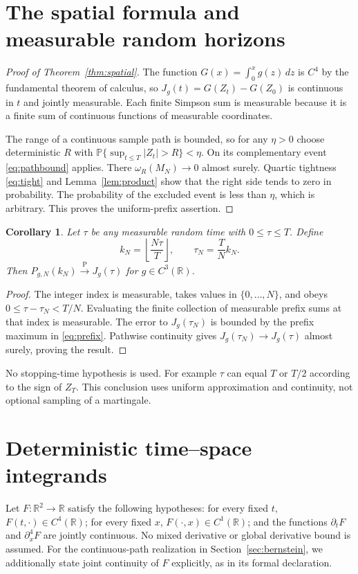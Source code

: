 \documentclass[11pt]{article}
\newtheorem{corollary}[theorem]{Corollary}
\theoremstyle{remark}\newtheorem{remark}[theorem]{Remark}
\newcommand{\R}{\mathbb R}\newcommand{\Pconv}{\xrightarrow{\mathrm P}}
\begin{document}
\section{The spatial formula and measurable random horizons}
\begin{proof}[Proof of Theorem~\ref{thm:spatial}]
The function $G(x)=\int_0^xg(z)\,dz$ is $C^4$ by the fundamental
theorem of calculus, so $J_g(t)=G(Z_t)-G(Z_0)$ is continuous in
$t$ and jointly measurable. Each finite Simpson sum is measurable
because it is a finite sum of continuous functions of measurable
coordinates.

The range of a continuous sample path is bounded, so for any
$\eta>0$ choose deterministic $R$ with
$\mathbb P\{\sup_{t\leq T}|Z_t|>R\}<\eta$.
On its complementary event \eqref{eq:pathbound} applies.
There $\omega_R(M_N)\to0$ almost surely. Quartic tightness
\eqref{eq:tight} and Lemma~\ref{lem:product} show that the
right side tends to zero in probability. The probability of the
excluded event is less than $\eta$, which is arbitrary. This
proves the uniform-prefix assertion.
\end{proof}

\begin{corollary}\label{cor:random}
Let $\tau$ be any measurable random time with $0\leq\tau\leq T$.
Define
\[
 k_N=\left\lfloor\frac{N\tau}{T}\right\rfloor,\qquad
 \tau_N=\frac{T}{N}k_N.
\]
Then $P_{g,N}(k_N)\Pconv J_g(\tau)$ for $g\in C^3(\R)$.
\end{corollary}
\begin{proof}
The integer index is measurable, takes values in $\{0,\ldots,N\}$,
and obeys $0\leq\tau-\tau_N<T/N$. Evaluating the finite collection
of measurable prefix sums at that index is measurable. The error
to $J_g(\tau_N)$ is bounded by the prefix maximum in
\eqref{eq:prefix}. Pathwise continuity gives
$J_g(\tau_N)\to J_g(\tau)$ almost surely, proving the result.
\end{proof}

No stopping-time hypothesis is used. For example $\tau$ can equal
$T$ or $T/2$ according to the sign of $Z_T$. This conclusion
uses uniform approximation and continuity, not optional sampling
of a martingale.

\section{Deterministic time--space integrands}
Let $F:\R^2\to\R$ satisfy the following hypotheses: for every
fixed $t$, $F(t,\cdot)\in C^4(\R)$; for every fixed $x$,
$F(\cdot,x)\in C^1(\R)$; and the functions $\partial_tF$ and
$\partial_x^4F$ are jointly continuous. No mixed derivative or
global derivative bound is assumed. For the continuous-path
realization in Section~\ref{sec:bernstein}, we additionally state
joint continuity of $F$ explicitly, as in its formal declaration.
\end{document}
